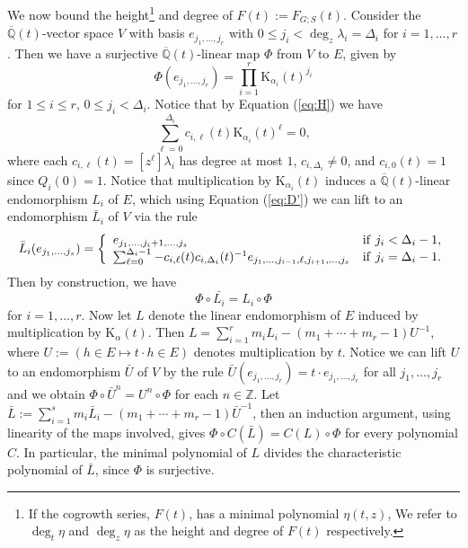 \documentclass[11pt]{amsart}
\theoremstyle{definition}
\newcommand{\Z}{\mathbb{Z}}
\newcommand{\inv}[1]{#1^{-1}}
\newcommand{\invCT}{\mathrm{K}}
\begin{document}
We now bound the height\footnote{If the cogrowth series, $F(t)$, has a minimal polynomial $\eta(t,z)$, We refer to $\deg_t\eta$ and $\deg_z\eta$ as the height and degree of $F(t)$ respectively.} and degree of $F(t):=F_{G;S}(t)$.
Consider the $\overline{\mathbb{Q}}(t)$-vector space $V$ with basis $e_{j_1,\ldots ,j_r}$ with $0\le j_i<\deg_z\lambda_i= \Delta_i$ for $i=1,\ldots ,r$.  Then we have a surjective $\overline{\mathbb{Q}}(t)$-linear map $\Phi$ from $V$ to $E$, given by 
$$\Phi(e_{j_1,\ldots ,j_r}) = \prod_{i=1}^r \invCT_{\alpha_i}(t)^{j_i}$$ for $1\le i\le r$, $0\le j_i< \Delta_i$. 
Notice that by Equation (\ref{eq:H}) we have
\begin{equation}
\label{eq:D'}
\sum_{\ell=0}^{\Delta_i} c_{i,\ell}(t) \invCT_{\alpha_i}(t)^{\ell} = 0,
\end{equation} where each $c_{i,\ell}(t)=[z^{\ell}]\lambda_i$ has degree at most $1$, $c_{i, \Delta_i}\neq 0$, and $c_{i,0}(t)=1$ since $Q_i(0)=1$.  
Notice that multiplication by $\invCT_{\alpha_i}(t)$ induces a $\overline{\mathbb{Q}}(t)$-linear endomorphism $L_i$ of $E$, which using Equation (\ref{eq:D'}) we can lift to an endomorphism $\bar{L}_i$ of $V$ via the rule
\begin{equation}\label{eq:endLiofV}
 \bar{L}_i(e_{j_1,\ldots ,j_s}) = \left\{ \begin{array}{ll} e_{j_1,\ldots ,j_i+1,\ldots ,j_s} & {\rm if}~ j_i < \Delta_i-1, \\
\sum_{\ell=0}^{\Delta_i-1} -c_{i,\ell}(t)c_{i,\Delta_i}(t)^{-1} e_{j_1,\ldots ,j_{i-1}, \ell, j_{i+1},\ldots ,j_s} & {\rm if}~j_i=\Delta_i-1. \end{array} \right. 
\end{equation}
Then by construction, we have $$\Phi\circ \bar{L_i}= L_i\circ \Phi$$ for $i=1,\ldots ,r$.
Now let $L$ denote the linear endomorphism of $E$ induced by multiplication by $\invCT_{\alpha}(t)$.  Then 
$L=  \sum_{i=1}^{r} m_i L_i - (m_1+\cdots +m_r-1)\inv{U}$, where $U:= (h \in E \mapsto t\cdot h\in E)$ denotes multiplication by $t$.
Notice we can lift $U$ to an endomorphism $\bar{U}$ of $V$ by the rule $\bar{U}(e_{j_1,\ldots ,j_r}) = t\cdot e_{j_1,\ldots ,j_r}$ for all $j_1,\ldots ,j_r$ and we obtain $\Phi\circ \bar{U}^n =U^n\circ \Phi$ for each $n\in \Z$.
Let
$\bar{L}:= \sum_{i=1}^{s} m_i \bar{L}_i - (m_1+\cdots +m_r-1) \inv{\bar{U}}$, then an induction argument, using linearity of the maps involved, gives $\Phi\circ C(\bar{L}) = C(L)\circ \Phi$ for every polynomial $C$.
In particular, the minimal polynomial of $L$ divides the characteristic polynomial of $\bar{L}$, since $\Phi$ is surjective.  
\end{document}
